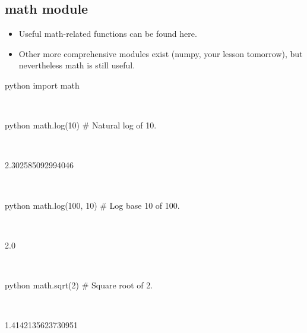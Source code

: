 \documentclass[aspectratio=1610,slidestop]{beamer}
\begin{document}
\subsection{math module}
\begin{pframe}
 \begin{itemize}
  \item Useful math-related functions can be found here.
  \item Other more comprehensive modules exist (numpy, your lesson tomorrow),
  but nevertheless math is still useful.
 \end{itemize}
 \begin{ipython}
  \begin{pythonin}{python}
import math
  \end{pythonin}
  \\
  \begin{pythonin}{python}
math.log(10)    # Natural log of 10.
  \end{pythonin}
  \\
  \begin{pythonout}
2.302585092994046
  \end{pythonout}
  \\

  \begin{pythonin}{python}
math.log(100, 10)    # Log base 10 of 100.
  \end{pythonin}
  \\
  \begin{pythonout}
2.0
  \end{pythonout}
  \\

  \begin{pythonin}{python}
math.sqrt(2)    # Square root of 2.
  \end{pythonin}
  \\
  \begin{pythonout}
1.4142135623730951
  \end{pythonout}
 \end{ipython}
\end{pframe}
\end{document}
